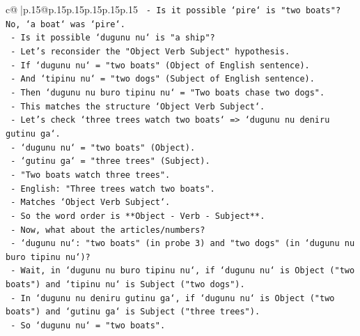 \documentclass{article}
\begin{document}
{\begin{supertabular}{c@{$\;$}|p{.15\linewidth}@{}p{.15\linewidth}p{.15\linewidth}p{.15\linewidth}p{.15\linewidth}p{.15\linewidth}}
{{{\texttt{                       {-} Is it possible `pire` is "two boats"? No, `a boat` was `pire`.} \\
\texttt{                       {-} Is it possible `dugunu nu` is "a ship"?} \\
\texttt{                       {-} Let's reconsider the "Object Verb Subject" hypothesis.} \\
\texttt{                         {-} If `dugunu nu` = "two boats" (Object of English sentence).} \\
\texttt{                         {-} And `tipinu nu` = "two dogs" (Subject of English sentence).} \\
\texttt{                         {-} Then `dugunu nu buro tipinu nu` = "Two boats chase two dogs".} \\
\texttt{                         {-} This matches the structure `Object Verb Subject`.} \\
\texttt{                         {-} Let's check `three trees watch two boats` => `dugunu nu deniru gutinu ga`.} \\
\texttt{                           {-} `dugunu nu` = "two boats" (Object).} \\
\texttt{                           {-} `gutinu ga` = "three trees" (Subject).} \\
\texttt{                           {-} "Two boats watch three trees".} \\
\texttt{                           {-} English: "Three trees watch two boats".} \\
\texttt{                           {-} Matches `Object Verb Subject`.} \\
\texttt{                       {-} So the word order is **Object {-} Verb {-} Subject**.} \\
\texttt{                       {-} Now, what about the articles/numbers?} \\
\texttt{                         {-} `dugunu nu`: "two boats" (in probe 3) and "two dogs" (in `dugunu nu buro tipinu nu`)?} \\
\texttt{                           {-} Wait, in `dugunu nu buro tipinu nu`, if `dugunu nu` is Object ("two boats") and `tipinu nu` is Subject ("two dogs").} \\
\texttt{                           {-} In `dugunu nu deniru gutinu ga`, if `dugunu nu` is Object ("two boats") and `gutinu ga` is Subject ("three trees").} \\
\texttt{                           {-} So `dugunu nu` = "two boats".} \\
}}}
\end{supertabular}}
\end{document}
